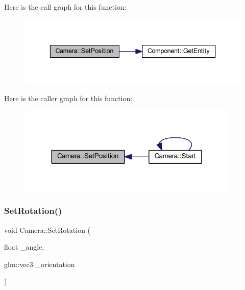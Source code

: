Here is the call graph for this function\+:
\nopagebreak
\begin{figure}[H]
\begin{center}
\leavevmode
\includegraphics[width=336pt]{class_camera_ab2c13ba0cd3d3b08feeab6a4f7d496bc_cgraph}
\end{center}
\end{figure}
Here is the caller graph for this function\+:
\nopagebreak
\begin{figure}[H]
\begin{center}
\leavevmode
\includegraphics[width=300pt]{class_camera_ab2c13ba0cd3d3b08feeab6a4f7d496bc_icgraph}
\end{center}
\end{figure}
\mbox{\label{class_camera_ae054ebd0fdc18f36dfcd4a3c968ec471}} 
\subsubsection{\texorpdfstring{Set\+Rotation()}{SetRotation()}}
{\footnotesize\ttfamily void Camera\+::\+Set\+Rotation (\begin{DoxyParamCaption}\item[{float}]{\+\_\+angle,  }\item[{glm\+::vec3}]{\+\_\+orientation }\end{DoxyParamCaption})}

\mbox{\label{class_camera_a9073f66c6522efed683d2867e197a6c8}} 
